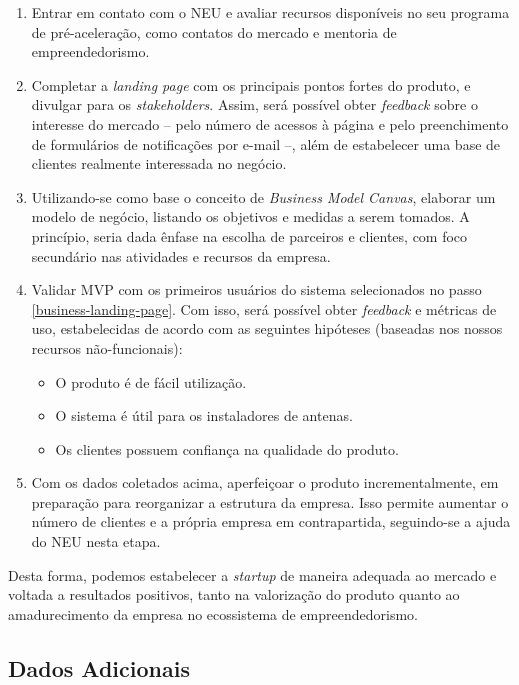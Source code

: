 \documentclass[]{politex}
\begin{document}
\begin{enumerate}
\item Entrar em contato com o NEU e avaliar recursos disponíveis no seu
programa de pré-aceleração, como contatos do mercado e mentoria de
empreendedorismo.
\item\label{business-landing-page} Completar a \textit{landing page} com os
principais pontos fortes do produto, e divulgar para os \textit{stakeholders}.
Assim, será possível obter \textit{feedback} sobre o interesse do mercado --
pelo número de acessos à página e pelo preenchimento de formulários de
notificações por e-mail --, além de estabelecer uma base de clientes realmente
interessada no negócio.
\item Utilizando-se como base o conceito de \textit{Business Model Canvas},
elaborar um modelo de negócio, listando os objetivos e medidas a serem tomados.
A princípio, seria dada ênfase na escolha de parceiros e clientes, com foco
secundário nas atividades e recursos da empresa.
\item Validar MVP com os primeiros usuários do sistema selecionados no passo
\ref{business-landing-page}. Com isso, será possível obter \textit{feedback} e
métricas de uso, estabelecidas de acordo com as seguintes hipóteses (baseadas
nos nossos recursos não-funcionais):
\begin{itemize}
\item O produto é de fácil utilização.
\item O sistema é útil para os instaladores de antenas.
\item Os clientes possuem confiança na qualidade do produto.
\end{itemize}
\item Com os dados coletados acima, aperfeiçoar o produto incrementalmente, em
preparação para reorganizar a estrutura da empresa. Isso permite aumentar o
número de clientes e a própria empresa em contrapartida, seguindo-se a ajuda
do NEU nesta etapa.
\end{enumerate}

Desta forma, podemos estabelecer a \textit{startup} de maneira adequada ao
mercado e voltada a resultados positivos, tanto na valorização do produto quanto
ao amadurecimento da empresa no ecossistema de empreendedorismo.

\subsection{Dados Adicionais}
\end{document}
